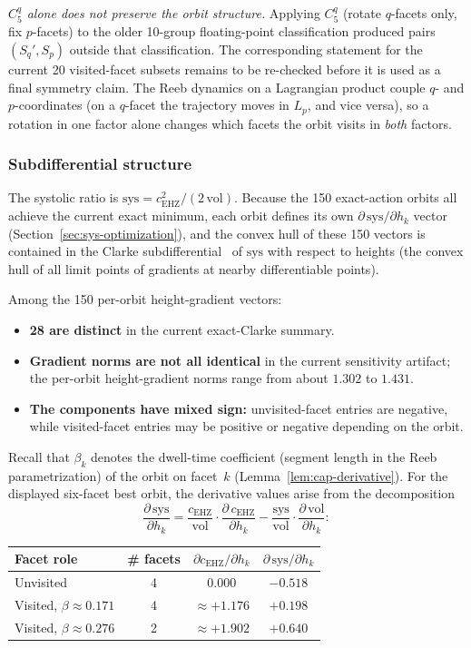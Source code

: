 \emph{$C_5^q$ alone does not preserve the orbit structure.}
Applying $C_5^q$ (rotate $q$-facets only, fix $p$-facets) to the older
10-group floating-point classification produced pairs $(S_q', S_p)$ outside
that classification.  The corresponding statement for the current 20
visited-facet subsets remains to be re-checked before it is used as a final
symmetry claim.
The Reeb dynamics on a Lagrangian product couple $q$- and
$p$-coordinates (on a $q$-facet
the trajectory moves in $L_p$, and vice versa), so a rotation
in one factor alone changes which facets the orbit visits in
\emph{both} factors.

\subsubsection*{Subdifferential structure}

The systolic ratio is $\mathrm{sys} = c_{\mathrm{EHZ}}^2 / (2\,\mathrm{vol})$.
Because the 150 exact-action orbits all achieve the current exact minimum,
each orbit defines its own
$\partial\,\mathrm{sys}/\partial h_k$ vector
(Section~\ref{sec:sys-optimization}),
and the convex hull of these 150 vectors is contained in the Clarke
subdifferential~\cite{Clarke1983} of $\mathrm{sys}$ with respect to
heights (the convex hull of all limit points of gradients at nearby
differentiable points).

Among the 150 per-orbit height-gradient vectors:
\begin{itemize}
\item \textbf{28 are distinct}
  in the current exact-Clarke summary.
\item \textbf{Gradient norms are not all identical}
  in the current sensitivity artifact; the per-orbit height-gradient norms
  range from about $1.302$ to $1.431$.
\item \textbf{The components have mixed sign:}
  unvisited-facet entries are negative, while visited-facet entries may be
  positive or negative depending on the orbit.
\end{itemize}

Recall that $\beta_k$ denotes the dwell-time coefficient
(segment length in the Reeb parametrization) of the orbit on
facet~$k$ (Lemma~\ref{lem:cap-derivative}).
For the displayed six-facet best orbit, the derivative values arise from
the decomposition
\[
  \frac{\partial\,\mathrm{sys}}{\partial h_k}
  = \frac{c_{\mathrm{EHZ}}}{\mathrm{vol}} \cdot
    \frac{\partial\,c_{\mathrm{EHZ}}}{\partial h_k}
  - \frac{\mathrm{sys}}{\mathrm{vol}} \cdot
    \frac{\partial\,\mathrm{vol}}{\partial h_k}:
\]
\begin{center}
\begin{tabular}{lccc}
\toprule
Facet role & \# facets &
$\partial c_{\mathrm{EHZ}} / \partial h_k$ &
$\partial\,\mathrm{sys}/\partial h_k$ \\
\midrule
Unvisited & 4 & $0.000$ & $-0.518$ \\
Visited, $\beta \approx 0.171$ & 4 & $\approx {+1.176}$ & $+0.198$ \\
Visited, $\beta \approx 0.276$ & 2 & $\approx {+1.902}$ & $+0.640$ \\
\bottomrule
\end{tabular}
\end{center}

